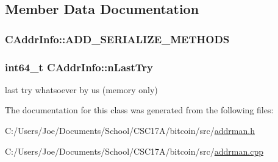 \subsection{Member Data Documentation}
\hypertarget{class_c_addr_info_a9d5e0b95fa494171e4bffb900094fe2e}{}
\subsubsection[{A\+D\+D\+\_\+\+S\+E\+R\+I\+A\+L\+I\+Z\+E\+\_\+\+M\+E\+T\+H\+O\+D\+S}]{\setlength{\rightskip}{0pt plus 5cm}C\+Addr\+Info\+::\+A\+D\+D\+\_\+\+S\+E\+R\+I\+A\+L\+I\+Z\+E\+\_\+\+M\+E\+T\+H\+O\+D\+S}\label{class_c_addr_info_a9d5e0b95fa494171e4bffb900094fe2e}
\hypertarget{class_c_addr_info_a4569955918c204d2edd073456108ddfd}{}
\subsubsection[{n\+Last\+Try}]{\setlength{\rightskip}{0pt plus 5cm}int64\+\_\+t C\+Addr\+Info\+::n\+Last\+Try}\label{class_c_addr_info_a4569955918c204d2edd073456108ddfd}


last try whatsoever by us (memory only) 



The documentation for this class was generated from the following files\+:\begin{DoxyCompactItemize}
\item 
C\+:/\+Users/\+Joe/\+Documents/\+School/\+C\+S\+C17\+A/bitcoin/src/\hyperlink{addrman_8h}{addrman.\+h}\item 
C\+:/\+Users/\+Joe/\+Documents/\+School/\+C\+S\+C17\+A/bitcoin/src/\hyperlink{addrman_8cpp}{addrman.\+cpp}\end{DoxyCompactItemize}
